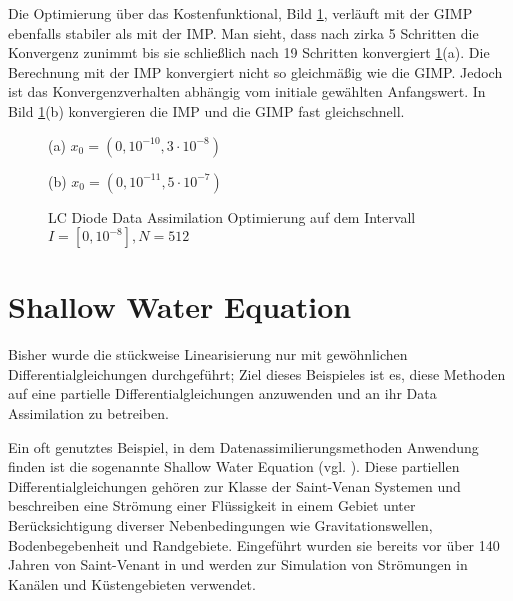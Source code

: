 Die Optimierung über das Kostenfunktional, Bild \ref{fig:lcOpt}, verläuft mit der GIMP ebenfalls stabiler als mit der IMP. Man sieht, dass nach zirka 5 Schritten die Konvergenz zunimmt bis sie schließlich nach 19 Schritten konvergiert \ref{fig:lcOpt}(a). Die Berechnung mit der IMP konvergiert nicht so gleichmäßig wie die GIMP. Jedoch ist das Konvergenzverhalten abhängig vom  initiale gewählten Anfangswert. In Bild \ref{fig:lcOpt}(b) konvergieren die IMP und die GIMP fast gleichschnell.

\begin{figure}[H]
\footnotesize
\centering
\begin{minipage}[b]{0.49\linewidth}

\caption*{(a) $x_0=(0,10^{-10},3\cdot 10^{-8})$}
\end{minipage}
\begin{minipage}[b]{0.49\linewidth}

\caption*{(b) $x_0=(0,10^{-11},5\cdot 10^{-7})$}
\end{minipage}
\caption{LC Diode Data Assimilation Optimierung auf dem Intervall $I = [0,10^{-8}], N=512$}
\label{fig:lcOpt}
\end{figure}


\section{Shallow Water Equation}
Bisher wurde die stückweise Linearisierung nur mit gewöhnlichen Differentialgleichungen durchgeführt; Ziel dieses Beispieles ist es, diese Methoden auf eine partielle Differentialgleichungen anzuwenden und an ihr Data Assimilation zu betreiben.

Ein oft genutztes Beispiel, in dem Datenassimilierungsmethoden Anwendung finden ist die sogenannte Shallow Water Equation (vgl. \cite{zou,navon}). 
Diese partiellen Differentialgleichungen gehören zur Klasse der Saint-Venan Systemen und beschreiben eine Strömung einer Flüssigkeit in einem Gebiet unter Berücksichtigung diverser Nebenbedingungen wie Gravitationswellen, Bodenbegebenheit und Randgebiete. Eingeführt wurden sie bereits vor über 140 Jahren von Saint-Venant in \cite{saint1871theorie} und werden zur Simulation von Strömungen in Kanälen und Küstengebieten verwendet.

